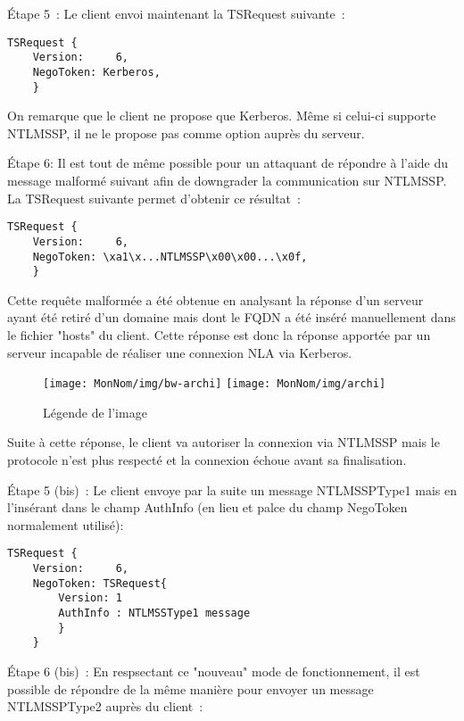Étape 5 :
Le client envoi maintenant la TSRequest suivante :

\begin{lstlisting}[frame=single,basicstyle=\tiny]
TSRequest {
	Version:     6,
	NegoToken: Kerberos,
	}
\end{lstlisting}


On remarque que le client ne propose que Kerberos. Même si celui-ci supporte NTLMSSP, il ne le propose pas comme option auprès du serveur.

Étape 6: 
Il est tout de même possible pour un attaquant de répondre à l'aide du message malformé suivant afin de downgrader la communication sur NTLMSSP. La TSRequest suivante permet d'obtenir ce résultat :

\begin{lstlisting}[frame=single,basicstyle=\tiny]
TSRequest {
	Version:     6,
	NegoToken: \xa1\x...NTLMSSP\x00\x00...\x0f,
	}
\end{lstlisting}


Cette requête malformée a été obtenue en analysant la réponse d'un serveur ayant été retiré d'un domaine mais dont le FQDN a été inséré manuellement dans le fichier "hosts" du client. Cette réponse est donc la réponse apportée par un serveur incapable de réaliser une connexion NLA via Kerberos.

\begin{figure}[ht]
  \centering
  \ifssticbw
    \texttt{[image: MonNom/img/bw-archi]}
  \else
    \texttt{[image: MonNom/img/archi]}
  \fi
  \caption{Légende de l'image}
  \label{fig:monnom:archi}
\end{figure}


Suite à cette réponse, le client va autoriser la connexion via NTLMSSP mais le protocole n'est plus respecté et la connexion échoue avant sa finalisation.

Étape 5 (bis) :
Le client envoye par la suite un message NTLMSSPType1 mais en l'insérant dans le champ AuthInfo (en lieu et palce du champ NegoToken normalement utilisé):

\begin{lstlisting}[frame=single,basicstyle=\tiny]
TSRequest {
	Version:     6,
	NegoToken: TSRequest{
		Version: 1
		AuthInfo : NTLMSSType1 message
		}
	}
\end{lstlisting}


Étape 6 (bis) :
En respsectant ce "nouveau" mode de fonctionnement, il est possible de répondre de la même manière pour envoyer un message NTLMSSPType2 auprès du client :

